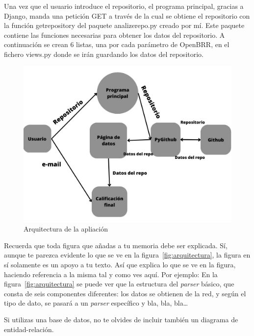 \documentclass[a4paper, 12pt]{book}
\begin{document}
Una vez que el usuario introduce el repositorio, el programa principal, gracias a Django, manda una petición GET a través de la cual se obtiene el repositorio con la función get\textunderscore repository del paquete analize\textunderscore repo.py creado por mí. Este paquete contiene las funciones necesarias para obtener los datos del repositorio. A continuación se crean 6 listas, una por cada parámetro de OpenBRR, en el fichero views.py donde se irán guardando los datos del repositorio.

\begin{figure}
    \centering
    \includegraphics[bb=0 0 800 600, width=12cm, keepaspectratio]{img/programaprincipal.jpg}
    \caption{Arquitectura de la apliación}\label{fig:arquitectura principal}
\end{figure}

 
Recuerda que toda figura que añadas a tu memoria debe ser explicada.
Sí, aunque te parezca evidente lo que se ve en la figura~\ref{fig:arquitectura}, la figura en sí solamente es un apoyo a tu texto.
Así que explica lo que se ve en la figura, haciendo referencia a la misma tal y como ves aquí.
Por ejemplo: En la figura~\ref{fig:arquitectura} se puede ver que la estructura del \emph{parser} básico, que consta de seis componentes diferentes: los datos se obtienen de la red, y según el tipo de dato, se pasará a un \emph{parser} específico y bla, bla, bla\ldots

Si utilizas una base de datos, no te olvides de incluir también un diagrama de entidad-relación.


\end{document}
